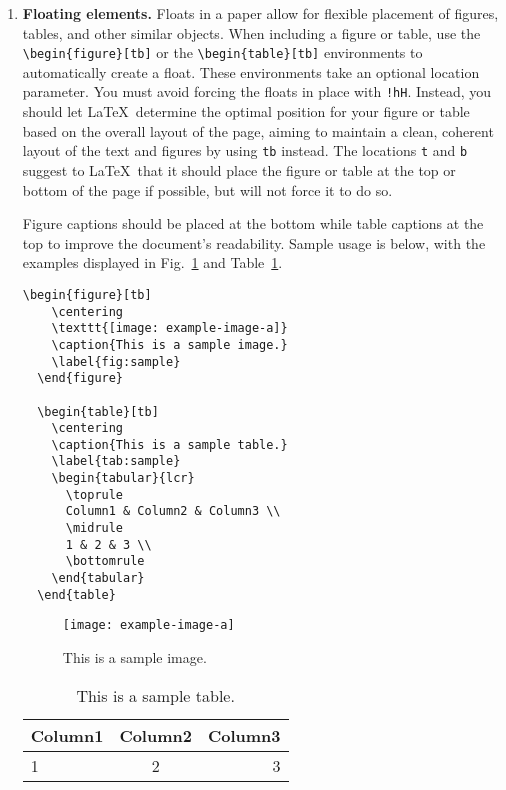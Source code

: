 \documentclass[fullpaper]{nldl}
\begin{document}
\begin{enumerate}[leftmargin=*]

\item \textbf{Floating elements.}
Floats in a paper allow for flexible placement of figures, tables, and other similar objects.
When including a figure or table, use the \verb|\begin{figure}[tb]| or the \verb|\begin{table}[tb]| environments to automatically create a float.
These environments take an optional location parameter.
You must avoid forcing the floats in place with \verb|!hH|.
Instead, you should let \LaTeX\ determine the optimal position for your figure or table based on the overall layout of the page, aiming to maintain a clean, coherent layout of the text and figures by using \verb|tb| instead.
The locations \verb|t| and \verb|b| suggest to \LaTeX\ that it should place the figure or table at the top or bottom of the page if possible, but will not force it to do so.

Figure captions should be placed at the bottom while table captions at the top to improve the document's readability.
Sample usage is below, with the examples displayed in Fig.~\ref{fig:sample} and Table~\ref{tab:sample}.
  \begin{lstlisting}[gobble=2]
  \begin{figure}[tb]
    \centering
    \texttt{[image: example-image-a]}
    \caption{This is a sample image.}
    \label{fig:sample}
  \end{figure}

  \begin{table}[tb]
    \centering
    \caption{This is a sample table.}
    \label{tab:sample}
    \begin{tabular}{lcr}
      \toprule
      Column1 & Column2 & Column3 \\
      \midrule
      1 & 2 & 3 \\
      \bottomrule
    \end{tabular}
  \end{table}
\end{lstlisting}

\begin{figure}[tb]
  \centering
  \texttt{[image: example-image-a]}
  \caption{This is a sample image.}
  \label{fig:sample}
\end{figure}

\begin{table}[tb]
  \centering
  \caption{This is a sample table.}
  \label{tab:sample}
  \begin{tabular}{lcr}
    \toprule
    Column1 & Column2 & Column3 \\
    \midrule
    1 & 2 & 3 \\
    \bottomrule
  \end{tabular}
\end{table}


\end{enumerate}
\end{document}
